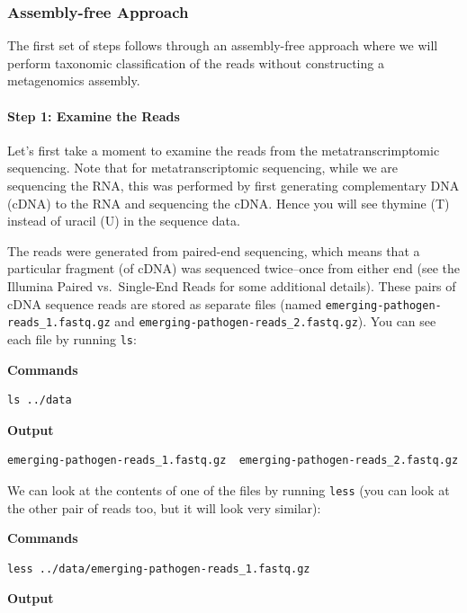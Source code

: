 \documentclass[
]{book}
\begin{document}
\subsubsection{Assembly-free Approach}\label{assembly-free-approach}

The first set of steps follows through an assembly-free approach where we will perform taxonomic classification of the reads without constructing a metagenomics assembly.

\paragraph{Step 1: Examine the Reads}\label{step-1-examine-the-reads}

Let's first take a moment to examine the reads from the metatranscrimptomic sequencing. Note that for metatranscriptomic sequencing, while we are sequencing the RNA, this was performed by first generating complementary DNA (cDNA) to the RNA and sequencing the cDNA. Hence you will see thymine (T) instead of uracil (U) in the sequence data.

The reads were generated from paired-end sequencing, which means that a particular fragment (of cDNA) was sequenced twice--once from either end (see the Illumina Paired vs.~Single-End Reads for some additional details). These pairs of cDNA sequence reads are stored as separate files (named \texttt{emerging-pathogen-reads\_1.fastq.gz} and \texttt{emerging-pathogen-reads\_2.fastq.gz}). You can see each file by running \texttt{ls}:

\textbf{Commands}

\begin{verbatim}
ls ../data
\end{verbatim}

\textbf{Output}

\begin{verbatim}
emerging-pathogen-reads_1.fastq.gz  emerging-pathogen-reads_2.fastq.gz
\end{verbatim}

We can look at the contents of one of the files by running \texttt{less} (you can look at the other pair of reads too, but it will look very similar):

\textbf{Commands}

\begin{verbatim}
less ../data/emerging-pathogen-reads_1.fastq.gz
\end{verbatim}

\textbf{Output}
\end{document}

